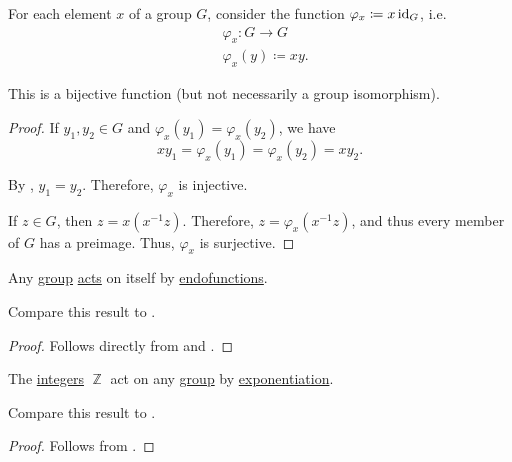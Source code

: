\begin{lemma}\label{thm:group_multiplication_is_bijection}
  For each element \( x \) of a group \( G \), consider the function \( \varphi_x \coloneqq x \operatorname{id}_G \), i.e.
  \begin{equation*}
    \begin{aligned}
      &\varphi_x: G \to G \\
      &\varphi_x(y) \coloneqq xy.
    \end{aligned}
  \end{equation*}

  This is a bijective function (but not necessarily a group isomorphism).
\end{lemma}
\begin{proof}
   If \( y_1, y_2 \in G \) and \( \varphi_x(y_1) = \varphi_x(y_2) \), we have
  \begin{equation*}
    xy_1 = \varphi_x(y_1) = \varphi_x(y_2) = xy_2.
  \end{equation*}

  By , \( y_1 = y_2 \). Therefore, \( \varphi_x \) is injective.

   If \( z \in G \), then \( z = x(x^{-1} z) \). Therefore, \( z = \varphi_x(x^{-1} z) \), and thus every member of \( G \) has a preimage. Thus, \( \varphi_x \) is surjective.
\end{proof}

\begin{theorem}\label{thm:cayleys_theorem}
  Any \hyperref[def:group]{group} \hyperref[def:group_action]{acts} on itself by \hyperref[def:multi_valued_function/endofunction]{endofunctions}.

  Compare this result to .
\end{theorem}
\begin{proof}
  Follows directly from  and .
\end{proof}

\begin{proposition}\label{thm:integers_group_action}
  The \hyperref[def:set_of_integers]{integers} \( \BbbZ \) act on any \hyperref[def:group]{group} by \hyperref[def:group/exponentiation]{exponentiation}.

  Compare this result to .
\end{proposition}
\begin{proof}
  Follows from .
\end{proof}
